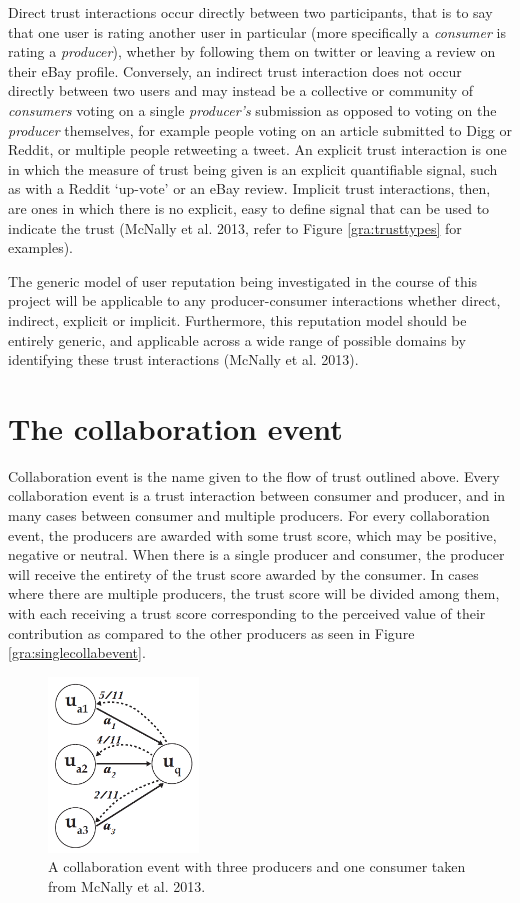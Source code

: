 \documentclass[]{final_report}
\begin{document}
Direct trust interactions occur directly between two participants, that is to say that one user is rating another user in particular (more specifically a \textsl{consumer} is rating a \textsl{producer}), whether by following them on twitter or leaving a review on their eBay profile. Conversely, an indirect trust interaction does not occur directly between two users and may instead be a collective or community of \textsl{consumers} voting on a single \textsl{producer's} submission as opposed to voting on the \textsl{producer} themselves, for example people voting on an article submitted to Digg or Reddit, or multiple people retweeting a tweet. An explicit trust interaction is one in which the measure of trust being given is an explicit quantifiable signal, such as with a Reddit `up-vote' or an eBay review. Implicit trust interactions, then, are ones in which there is no explicit, easy to define signal that can be used to indicate the trust (McNally et al. 2013, refer to Figure \ref{gra:trusttypes} for examples).

The generic model of user reputation being investigated in the course of this project will be applicable to any producer-consumer interactions whether direct, indirect, explicit or implicit. Furthermore, this reputation model should be entirely generic, and applicable across a wide range of possible domains by identifying these trust interactions (McNally et al. 2013).

\section{The collaboration event}

Collaboration event is the name given to the flow of trust outlined above. Every 
collaboration event is a trust interaction between consumer and producer, and in many cases between consumer and multiple producers. For every collaboration event, the producers are awarded with some trust score, which may be positive, negative or neutral. When there is a single producer and consumer, the producer will receive the entirety of the trust score awarded by the consumer. In cases where there are multiple producers, the trust score will be divided among them, with each receiving a trust score corresponding to the perceived value of their contribution as compared to the other producers as seen in Figure \ref{gra:singlecollabevent}.

\begin{figure}[ht!]
\centering
\includegraphics[width=40mm]{chap3/singlecollabevent.png}
\caption{A collaboration event with three producers and one consumer taken from McNally et al. 2013.}
\end{figure}\label{gra:singlecollabevent}
\end{document}
